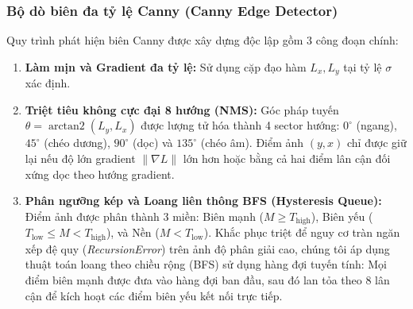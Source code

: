 \subsubsection{Bộ dò biên đa tỷ lệ Canny (Canny Edge Detector)}
Quy trình phát hiện biên Canny \cite{canny1986computational} được xây dựng độc lập gồm 3 công đoạn chính:
\begin{enumerate}
    \item \textbf{Làm mịn và Gradient đa tỷ lệ:} Sử dụng cặp đạo hàm $L_x, L_y$ tại tỷ lệ $\sigma$ xác định.
    \item \textbf{Triệt tiêu không cực đại 8 hướng (NMS):} Góc pháp tuyến $\theta = \operatorname{arctan2}(L_y, L_x)$ được lượng tử hóa thành 4 sector hướng: $0^\circ$ (ngang), $45^\circ$ (chéo dương), $90^\circ$ (dọc) và $135^\circ$ (chéo âm). Điểm ảnh $(y, x)$ chỉ được giữ lại nếu độ lớn gradient $\|\nabla L\|$ lớn hơn hoặc bằng cả hai điểm lân cận đối xứng dọc theo hướng gradient.
    \item \textbf{Phân ngưỡng kép và Loang liên thông BFS (Hysteresis Queue):} Điểm ảnh được phân thành 3 miền: Biên mạnh ($M \ge T_{\text{high}}$), Biên yếu ($T_{\text{low}} \le M < T_{\text{high}}$), và Nền ($M < T_{\text{low}}$). Khắc phục triệt để nguy cơ tràn ngăn xếp đệ quy (\textit{RecursionError}) trên ảnh độ phân giải cao, chúng tôi áp dụng thuật toán loang theo chiều rộng (BFS) sử dụng hàng đợi tuyến tính: Mọi điểm biên mạnh được đưa vào hàng đợi ban đầu, sau đó lan tỏa theo 8 lân cận để kích hoạt các điểm biên yếu kết nối trực tiếp.
\end{enumerate}

